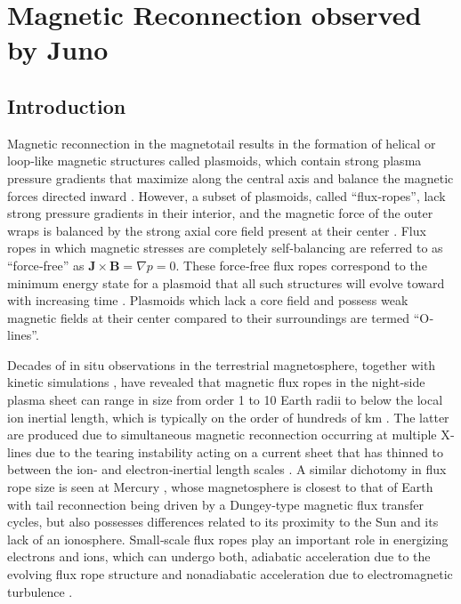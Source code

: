 \chapter{Magnetic Reconnection observed by Juno}

\section{Introduction}
Magnetic reconnection in the magnetotail results in the formation of helical or loop‐like magnetic structures called plasmoids, which contain strong plasma pressure gradients that maximize along the central axis and balance the magnetic forces directed inward \cite{Hones1984StructureActivity, Kivelson1995ModelsPlasmas, Slavin1989CDAWAssessment}. However, a subset of plasmoids, called ``flux‐ropes'', lack strong pressure gradients in their interior, and the magnetic force of the outer wraps is balanced by the strong axial core field present at their center \cite{Moldwin1991PlasmoidsRopes,Sibeck1984MagnetotailRopes}. Flux ropes in which magnetic stresses are completely self‐balancing are referred to as “force‐free” as $\mathbf{J}\times\mathbf{B}=\nabla p = 0$. These force‐free flux ropes correspond to the minimum energy state for a plasmoid that all such structures will evolve toward with increasing time \cite{Priest2013TheLecture,Taylor1974RelaxationFields}. Plasmoids which lack a core field and possess weak magnetic fields at their center compared to their surroundings are termed ``O‐lines''.

Decades of in situ observations in the terrestrial magnetosphere, together with kinetic simulations \cite{Drake2006ElectronReconnection, Drake2006FormationReconnection}, have revealed that magnetic flux ropes in the night‐side plasma sheet can range in size from order 1 to 10 Earth radii \cite{Ieda1998StatisticalObservations,Slavin1995ISEETopologies} to below the local ion inertial length, which is typically on the order of hundreds of km \cite{Eastwood2016Ion-scaleMMS,Sun2019MMSSheet}. The latter are produced due to simultaneous magnetic reconnection occurring at multiple X‐lines due to the tearing instability acting on a current sheet that has thinned to between the ion‐ and electron‐inertial length scales \cite{Daughton2011RolePlasmas,Drake2006ElectronReconnection,Lapenta2015SecondaryFronts}. A similar dichotomy in flux rope size is seen at Mercury \cite{DiBraccio2015MESSENGERMagnetotail,Slavin2009MESSENGERMagnetosphere,Zhong2019Magnetotail}, whose magnetosphere is closest to that of Earth with tail reconnection being driven by a Dungey‐type \cite{Dungey1961b} magnetic flux transfer cycles, but also possesses differences related to its proximity to the Sun and its lack of an ionosphere. Small‐scale flux ropes play an important role in energizing electrons and ions, which can undergo both, adiabatic acceleration due to the evolving flux rope structure \cite{Drake2006FormationReconnection,Le2012ElectronCoalescence,Zhong2019Magnetotail} and nonadiabatic acceleration due to electromagnetic turbulence \cite{Kronberg2019AccelerationRole}.


